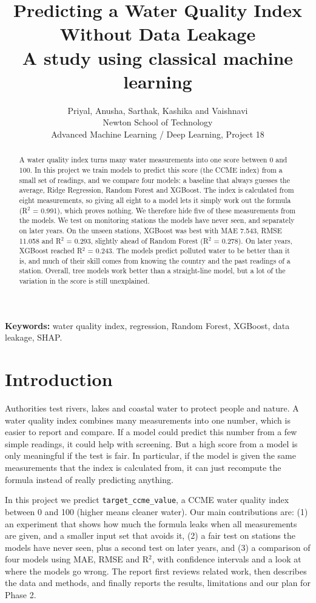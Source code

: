 \documentclass[11pt,a4paper]{article}
\title{\bfseries\color{acc} Predicting a Water Quality Index Without Data Leakage\\[2pt]\large\mdseries\color{black}A study using classical machine learning}
\author{Priyal, Anusha, Sarthak, Kashika and Vaishnavi\\Newton School of Technology\\Advanced Machine Learning / Deep Learning, Project 18}
\date{}
\begin{document}
\maketitle
\begin{abstract}\noindent
A water quality index turns many water measurements into one score between 0 and 100. In this project we train models to predict this score (the CCME index) from a small set of readings, and we compare four models: a baseline that always guesses the average, Ridge Regression, Random Forest and XGBoost. The index is calculated from eight measurements, so giving all eight to a model lets it simply work out the formula (R$^2$ = 0.991), which proves nothing. We therefore hide five of these measurements from the models. We test on monitoring stations the models have never seen, and separately on later years. On the unseen stations, XGBoost was best with MAE 7.543, RMSE 11.058 and R$^2$ = 0.293, slightly ahead of Random Forest (R$^2$ = 0.278). On later years, XGBoost reached R$^2$ = 0.243. The models predict polluted water to be better than it is, and much of their skill comes from knowing the country and the past readings of a station. Overall, tree models work better than a straight-line model, but a lot of the variation in the score is still unexplained.
\end{abstract}
\noindent\textbf{Keywords:} water quality index, regression, Random Forest, XGBoost, data leakage, SHAP.

\section{Introduction}
Authorities test rivers, lakes and coastal water to protect people and nature. A water quality index combines many measurements into one number, which is easier to report and compare. If a model could predict this number from a few simple readings, it could help with screening. But a high score from a model is only meaningful if the test is fair. In particular, if the model is given the same measurements that the index is calculated from, it can just recompute the formula instead of really predicting anything.

In this project we predict \texttt{target\_ccme\_value}, a CCME water quality index between 0 and 100 (higher means cleaner water). Our main contributions are: (1) an experiment that shows how much the formula leaks when all measurements are given, and a smaller input set that avoids it, (2) a fair test on stations the models have never seen, plus a second test on later years, and (3) a comparison of four models using MAE, RMSE and R$^2$, with confidence intervals and a look at where the models go wrong. The report first reviews related work, then describes the data and methods, and finally reports the results, limitations and our plan for Phase 2.
\end{document}
